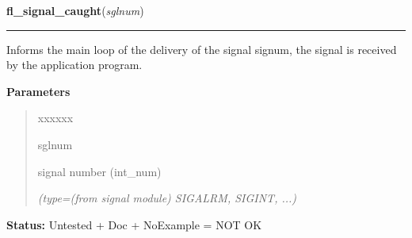 \hspace{.8\funcindent}\begin{boxedminipage}{\funcwidth}

    \raggedright \textbf{fl\_signal\_caught}(\textit{sglnum})

    \vspace{-1.5ex}

    \rule{\textwidth}{0.5\fboxrule}
\setlength{\parskip}{2ex}
    Informs the main loop of the delivery of the signal signum, the signal 
    is received by the application program.

\setlength{\parskip}{1ex}
      \textbf{Parameters}
      \vspace{-1ex}

      \begin{quote}
        \begin{Ventry}{xxxxxx}

          \item[sglnum]

          signal number (int\_num)

            {\it (type=(from signal module) SIGALRM, SIGINT, ...)}

        \end{Ventry}

      \end{quote}

\textbf{Status:} Untested + Doc + NoExample = NOT OK



    \end{boxedminipage}

    \label{xformslib:library:fl_app_signal_direct}

    \vspace{0.5ex}

